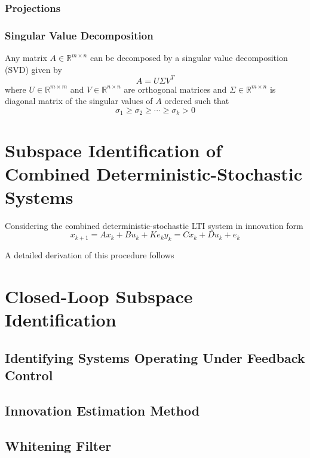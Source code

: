 \subsubsection*{Projections}


\subsubsection*{Singular Value Decomposition}
Any matrix $A \in \mathbb{R}^{m\times n}$ can be decomposed by a singular value decomposition (SVD) given by
\begin{equation*}
A = U\Sigma V^T
\end{equation*}
where $U \in \mathbb{R}^{m\times m}$ and $V \in \mathbb{R}^{n\times n}$ are orthogonal matrices and $\Sigma \in \mathbb{R}^{m\times n}$ is diagonal matrix of the singular values of $A$ ordered such that
\begin{equation*}
\sigma_1 \geq \sigma_2 \geq \cdots \geq \sigma_k > 0
\end{equation*}




\section{Subspace Identification of Combined Deterministic-Stochastic Systems}
Considering the combined deterministic-stochastic LTI system in innovation form
\begin{subequations}
\begin{equation}x_{k+1} = Ax_k + Bu_k + Ke_k\end{equation}
\begin{equation}y_k = Cx_k + Du_k + e_k\end{equation}
\end{subequations}



A detailed derivation of this procedure follows


\section{Closed-Loop Subspace Identification}

\subsection{Identifying Systems Operating Under Feedback Control}

\subsection{Innovation Estimation Method}

\subsection{Whitening Filter}